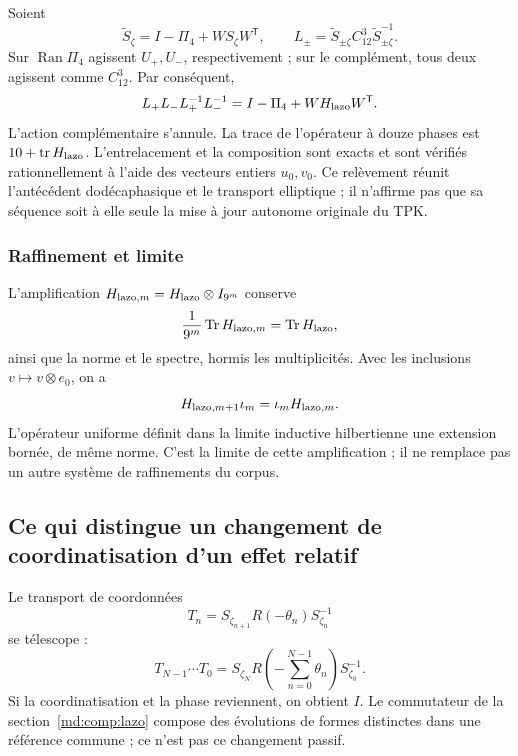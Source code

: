 Soient
\[
 \widetilde S_\zeta=I-\Pi_4+WS_\zeta W^{\mathsf T},\qquad
 L_\pm=\widetilde S_{\pm\zeta}C_{12}^3
       \widetilde S_{\pm\zeta}^{-1}.
\]
Sur \(\operatorname{Ran}\Pi_4\) agissent \(U_+,U_-\), respectivement ;
sur le complément, tous deux agissent comme \(C_{12}^3\). Par conséquent,
\begin{equation}
 L_+L_-L_+^{-1}L_-^{-1}
 =I-\Pi_4+WH_{\rm lazo}W^{\mathsf T}.
 \label{md:comp:levantamiento-lazo}
\end{equation}
L’action complémentaire s’annule. La trace de l’opérateur à douze
phases est \(10+\operatorname{tr}H_{\rm lazo}\).
L’entrelacement et la composition sont exacts et sont vérifiés
rationnellement à l’aide des vecteurs entiers \(u_0,v_0\).
Ce relèvement réunit l’antécédent dodécaphasique et le transport
elliptique ; il n’affirme pas que sa séquence soit à elle seule la mise à jour
autonome originale du TPK.

\subsubsection{Raffinement et limite}
\label{md:comp:limite}

L’amplification
\(H_{{\rm lazo},m}=H_{\rm lazo}\otimes I_{9^m}\) conserve
\[
 \frac{1}{9^m}\operatorname{Tr}H_{{\rm lazo},m}
 =\operatorname{Tr}H_{\rm lazo},
\]
ainsi que la norme et le spectre, hormis les multiplicités.
Avec les inclusions \(v\mapsto v\otimes e_0\), on a
\[
 H_{{\rm lazo},m+1}\iota_m=\iota_m H_{{\rm lazo},m}.
\]
L’opérateur uniforme définit dans la limite inductive hilbertienne une
extension bornée, de même norme. C’est la limite de cette
amplification ; il ne remplace pas un autre système de raffinements
du corpus.

\subsection{Ce qui distingue un changement de coordinatisation d’un effet relatif}
\label{md:comp:carta-efecto}

Le transport de coordonnées
\[
 T_n=S_{\zeta_{n+1}}R(-\theta_n)S_{\zeta_n}^{-1}
\]
se télescope :
\begin{equation}
 T_{N-1}\cdots T_0
 =S_{\zeta_N}R\left(-\sum_{n=0}^{N-1}\theta_n\right)
 S_{\zeta_0}^{-1}.
 \label{md:comp:telescopaje}
\end{equation}
Si la coordinatisation et la phase reviennent, on obtient \(I\). Le commutateur de la
section~\ref{md:comp:lazo} compose des évolutions de formes distinctes
dans une référence commune ; ce n’est pas ce changement passif.

